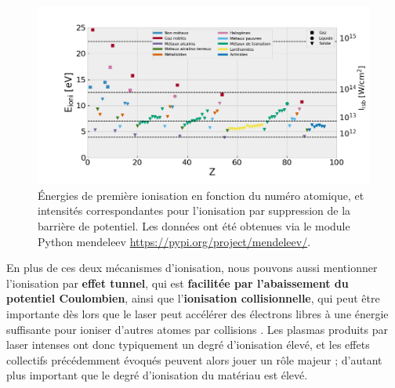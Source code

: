 \begin{refsection}
\begin{figure}[hbtp]
    \centering
    \includegraphics[width=0.85\linewidth]{2-laser/ionisation_Z.png}
    \caption{Énergies de première ionisation en fonction du numéro atomique, et intensités correspondantes pour l'ionisation par suppression de la barrière de potentiel. Les données ont été obtenues via le module Python mendeleev \url{https://pypi.org/project/mendeleev/}.}
    \label{fig:2-intensite_ionisation}
\end{figure}

En plus de ces deux mécanismes d'ionisation, nous pouvons aussi mentionner l'ionisation par \textbf{effet tunnel}, qui est \textbf{facilitée par l'abaissement du potentiel Coulombien}, ainsi que l'\textbf{ionisation collisionnelle}, qui peut être importante dès lors que le laser peut accélérer des électrons libres à une énergie suffisante pour ioniser d'autres atomes par collisions \parencite{zaim_phd}.
Les plasmas produits par laser intenses ont donc typiquement un degré d'ionisation élevé, et les effets collectifs précédemment évoqués peuvent alors jouer un rôle majeur ; d'autant plus important que le degré d'ionisation du matériau est élevé.



\end{refsection}
